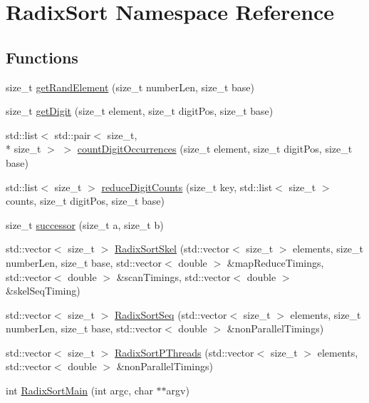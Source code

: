 \hypertarget{namespaceRadixSort}{\section{Radix\-Sort Namespace Reference}
\label{namespaceRadixSort}
}
\subsection*{Functions}
\begin{DoxyCompactItemize}
\item 
size\-\_\-t \hyperlink{namespaceRadixSort_ac13c88db80ae3076f6ea9690547ea76c}{get\-Rand\-Element} (size\-\_\-t number\-Len, size\-\_\-t base)
\item 
size\-\_\-t \hyperlink{namespaceRadixSort_a56dac59f88644c897d2024ef83ff59e6}{get\-Digit} (size\-\_\-t element, size\-\_\-t digit\-Pos, size\-\_\-t base)
\item 
std\-::list$<$ std\-::pair$<$ size\-\_\-t, \\*
size\-\_\-t $>$ $>$ \hyperlink{namespaceRadixSort_a94215411eca63e3dec41a388ba5d4c90}{count\-Digit\-Occurrences} (size\-\_\-t element, size\-\_\-t digit\-Pos, size\-\_\-t base)
\item 
std\-::list$<$ size\-\_\-t $>$ \hyperlink{namespaceRadixSort_a0ce073514c0336316e5fc6f6eb882133}{reduce\-Digit\-Counts} (size\-\_\-t key, std\-::list$<$ size\-\_\-t $>$ counts, size\-\_\-t digit\-Pos, size\-\_\-t base)
\item 
size\-\_\-t \hyperlink{namespaceRadixSort_a74ff36cdd961ac981ad33a4a77edd6cd}{successor} (size\-\_\-t a, size\-\_\-t b)
\item 
std\-::vector$<$ size\-\_\-t $>$ \hyperlink{namespaceRadixSort_a42d0ff709befdd3b200bf12dbb397827}{Radix\-Sort\-Skel} (std\-::vector$<$ size\-\_\-t $>$ elements, size\-\_\-t number\-Len, size\-\_\-t base, std\-::vector$<$ double $>$ \&map\-Reduce\-Timings, std\-::vector$<$ double $>$ \&scan\-Timings, std\-::vector$<$ double $>$ \&skel\-Seq\-Timing)
\item 
std\-::vector$<$ size\-\_\-t $>$ \hyperlink{namespaceRadixSort_af578ab7d534fe45bf0b6e9a1425ec2f5}{Radix\-Sort\-Seq} (std\-::vector$<$ size\-\_\-t $>$ elements, size\-\_\-t number\-Len, size\-\_\-t base, std\-::vector$<$ double $>$ \&non\-Parallel\-Timings)
\item 
std\-::vector$<$ size\-\_\-t $>$ \hyperlink{namespaceRadixSort_a49a4b8a61831a2d993b66b1d5c524ea6}{Radix\-Sort\-P\-Threads} (std\-::vector$<$ size\-\_\-t $>$ elements, std\-::vector$<$ double $>$ \&non\-Parallel\-Timings)
\item 
int \hyperlink{namespaceRadixSort_aded21782e30d6d041ca21cfcb43c8496}{Radix\-Sort\-Main} (int argc, char $\ast$$\ast$argv)
\end{DoxyCompactItemize}



